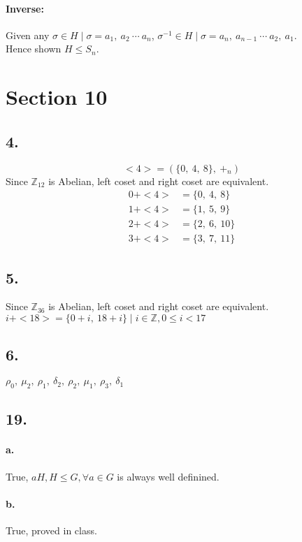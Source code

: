 \documentclass{article}
\begin{document}
\paragraph{Inverse: }Given any $\sigma \in H \mid \sigma = {a_1,\ a_2\ \cdots\
a_n}$, $\sigma^{-1} \in H \mid \sigma = {a_n,\ a_{n-1}\ \cdots\ a_2,\ a_1}$.\\
Hence shown $H \le S_n$.

\section*{Section 10}
\subsection*{4. }
$$<4> = (\{0,\ 4,\ 8\},\ +_n)$$
Since $\mathbb{Z}_{12}$ is Abelian, left coset and right coset are equivalent.\\
\begin{align*}
0+<4> &= \{0,\ 4,\ 8\}\\
1+<4> &= \{1,\ 5,\ 9\}\\
2+<4> &= \{2,\ 6,\ 10\}\\
3+<4> &= \{3,\ 7,\ 11\}
\end{align*}

\subsection*{5. }
Since $\mathbb{Z}_{36}$ is Abelian, left coset and right coset are equivalent.\\
${i+<18> = \{0+i,\ 18+i\}\mid i \in \mathbb{Z}, 0 \le i < 17}$

\subsection*{6. }
${\rho_0,\ \mu_2},\ {\rho_1,\ \delta_2},\ {\rho_2,\ \mu_1},\ {\rho_3,\ \delta_1}$

\subsection*{19. }
\paragraph{a. }True, $aH, H\le G, \forall a\in G$ is always well definined.
\paragraph{b. }True, proved in class.
\end{document}
